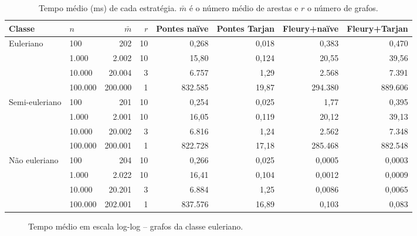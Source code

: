 \begin{table}[H]
\centering
\small
\setlength{\tabcolsep}{4pt}
\caption{Tempo médio (ms) de cada estratégia. $\bar m$ é o número médio de arestas e $r$ o número de grafos.}
\label{tab:resultados}
\begin{tabular}{llrrrrrr}
\toprule
Classe & $n$ & $\bar m$ & $r$ & Pontes naïve & Pontes Tarjan & Fleury+naïve & Fleury+Tarjan \\
\midrule
Euleriano & 100 & 202 & 10 & 0,268 & 0,018 & 0,383 & 0,470 \\
 & 1.000 & 2.002 & 10 & 15,80 & 0,124 & 20,55 & 39,56 \\
 & 10.000 & 20.004 & 3 & 6.757 & 1,29 & 2.568 & 7.391 \\
 & 100.000 & 200.000 & 1 & 832.585 & 19,87 & 294.380 & 889.606 \\
\midrule
Semi-euleriano & 100 & 201 & 10 & 0,254 & 0,025 & 1,77 & 0,395 \\
 & 1.000 & 2.001 & 10 & 16,05 & 0,119 & 20,12 & 39,13 \\
 & 10.000 & 20.002 & 3 & 6.816 & 1,24 & 2.562 & 7.348 \\
 & 100.000 & 200.001 & 1 & 822.728 & 17,18 & 285.468 & 882.548 \\
\midrule
Não euleriano & 100 & 204 & 10 & 0,266 & 0,025 & 0,0005 & 0,0003 \\
 & 1.000 & 2.022 & 10 & 16,41 & 0,104 & 0,0012 & 0,0009 \\
 & 10.000 & 20.201 & 3 & 6.884 & 1,25 & 0,0086 & 0,0065 \\
 & 100.000 & 202.001 & 1 & 837.576 & 16,89 & 0,103 & 0,083 \\
\bottomrule
\end{tabular}
\end{table}

\begin{figure}[H]
\centering
{}
\caption{Tempo médio em escala log-log -- grafos da classe euleriano.}
\label{fig:euleriano}
\end{figure}

